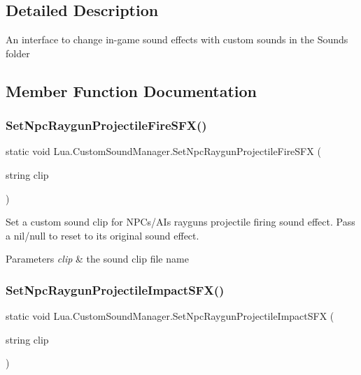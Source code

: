 \subsection{Detailed Description}
An interface to change in-\/game sound effects with custom sounds in the Sounds folder 



\subsection{Member Function Documentation}
\mbox{\label{class_lua_1_1_custom_sound_manager_a920b942d5d7751c3ff7676a48189c8ca}} 
\subsubsection{\texorpdfstring{SetNpcRaygunProjectileFireSFX()}{SetNpcRaygunProjectileFireSFX()}}
{\footnotesize\ttfamily static void Lua.\+Custom\+Sound\+Manager.\+Set\+Npc\+Raygun\+Projectile\+Fire\+S\+FX (\begin{DoxyParamCaption}\item[{string}]{clip }\end{DoxyParamCaption})\hspace{0.3cm}{\ttfamily [static]}}



Set a custom sound clip for N\+P\+Cs/\+A\+Is raygun\textquotesingle{}s projectile firing sound effect. Pass a nil/null to reset to its original sound effect. 


\begin{DoxyParams}{Parameters}
{\em clip} & the sound clip file name\\
\hline
\end{DoxyParams}
\mbox{\label{class_lua_1_1_custom_sound_manager_a5cf94ae4cc82a6ae9137b953c2b37b0f}} 
\subsubsection{\texorpdfstring{SetNpcRaygunProjectileImpactSFX()}{SetNpcRaygunProjectileImpactSFX()}}
{\footnotesize\ttfamily static void Lua.\+Custom\+Sound\+Manager.\+Set\+Npc\+Raygun\+Projectile\+Impact\+S\+FX (\begin{DoxyParamCaption}\item[{string}]{clip }\end{DoxyParamCaption})\hspace{0.3cm}{\ttfamily [static]}}



